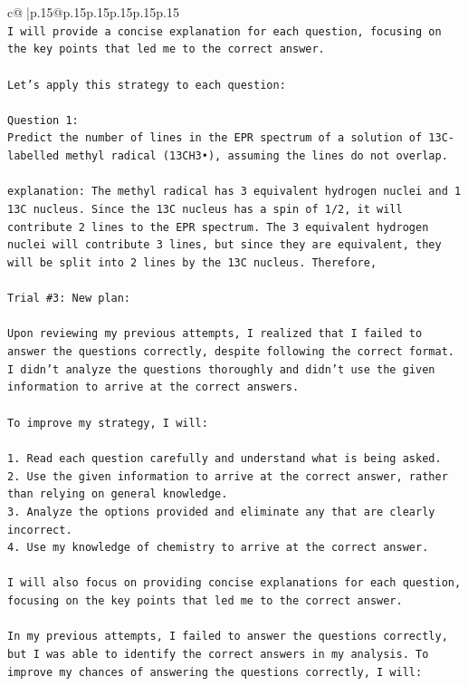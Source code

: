 \documentclass{article}
\begin{document}
{\begin{supertabular}{c@{$\;$}|p{.15\linewidth}@{}p{.15\linewidth}p{.15\linewidth}p{.15\linewidth}p{.15\linewidth}p{.15\linewidth}}
{{{\\ 
\texttt{I will provide a concise explanation for each question, focusing on the key points that led me to the correct answer.} \\
\\ 
\texttt{Let's apply this strategy to each question:} \\
\\ 
\texttt{Question 1:} \\
\texttt{Predict the number of lines in the EPR spectrum of a solution of 13C{-}labelled methyl radical (13CH3•), assuming the lines do not overlap.} \\
\\ 
\texttt{explanation: The methyl radical has 3 equivalent hydrogen nuclei and 1 13C nucleus. Since the 13C nucleus has a spin of 1/2, it will contribute 2 lines to the EPR spectrum. The 3 equivalent hydrogen nuclei will contribute 3 lines, but since they are equivalent, they will be split into 2 lines by the 13C nucleus. Therefore,} \\
\\ 
\texttt{Trial \#3: New plan: } \\
\\ 
\texttt{Upon reviewing my previous attempts, I realized that I failed to answer the questions correctly, despite following the correct format. I didn't analyze the questions thoroughly and didn't use the given information to arrive at the correct answers. } \\
\\ 
\texttt{To improve my strategy, I will:} \\
\\ 
\texttt{1. Read each question carefully and understand what is being asked.} \\
\texttt{2. Use the given information to arrive at the correct answer, rather than relying on general knowledge.} \\
\texttt{3. Analyze the options provided and eliminate any that are clearly incorrect.} \\
\texttt{4. Use my knowledge of chemistry to arrive at the correct answer.} \\
\\ 
\texttt{I will also focus on providing concise explanations for each question, focusing on the key points that led me to the correct answer.} \\
\\ 
\texttt{In my previous attempts, I failed to answer the questions correctly, but I was able to identify the correct answers in my analysis. To improve my chances of answering the questions correctly, I will:} \\
}}}
\end{supertabular}}
\end{document}

